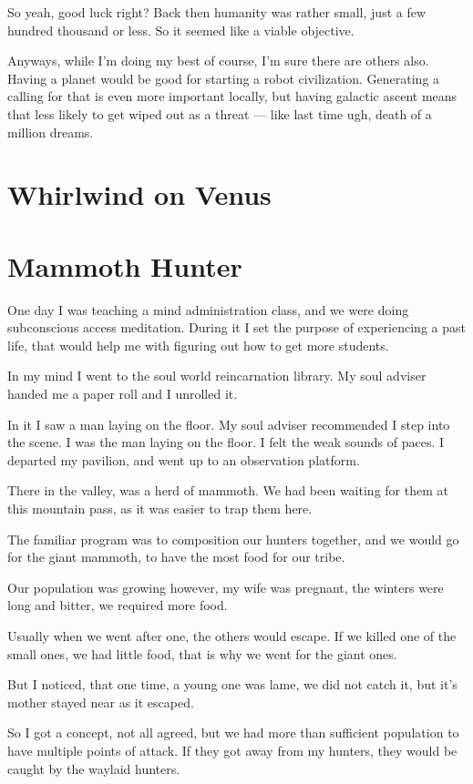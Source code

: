 So yeah, good luck right? Back then humanity was rather small, just a few hundred thousand or less. So it seemed like a viable objective.

Anyways, while I'm doing my best of course, I'm sure there are others also.
Having a planet would be good for starting a robot civilization. Generating a
calling for that is even more important locally, but having galactic ascent
means that less likely to get wiped out as a threat --- like last time ugh, death of a million dreams. 
\chapter{Whirlwind on Venus}
\chapter{Mammoth Hunter}
\label{reincarnation:mammoth}
One day I was teaching a mind administration class, and we were doing 
subconscious access meditation. During it I set the purpose of experiencing a
past life, that would help me with figuring out how to get more students.

In my mind I went to the soul world reincarnation library. My soul adviser
handed me a paper roll and I unrolled it.

In it I saw a man laying on the floor. My soul adviser recommended I step into
the scene. I was the man laying on the floor. I felt the weak sounds of
paces. I departed my pavilion, and went up to an observation platform.

There in the valley, was a herd of mammoth. We had been waiting for them at this
mountain pass, as it was easier to trap them here. 

The familiar program was to composition our hunters together, and we would go for
the giant mammoth, to have the most food for our tribe. 

Our population was growing however, my wife was pregnant, the winters were long
 and bitter, we required more food.

Usually when we went after one, the others would escape. 
If we killed one of the small ones, we had little food,
that is why we went for the giant ones. 

But I noticed, that one time, a young one was lame, we did not catch it, but
it's mother stayed near as it escaped. 

So I got a concept, not all agreed, but we had more than sufficient population 
to have multiple points of attack. If they got away from my hunters, they would 
be caught by the waylaid hunters. 

